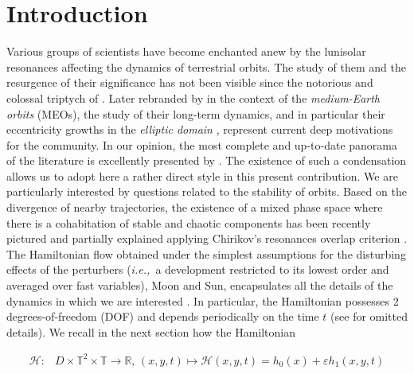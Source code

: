 \documentclass{amsart}
\theoremstyle{definition}
\theoremstyle{remark}
\numberwithin{equation}{section}
\newcommand{\ie}{\textit{i.e.,\ }}
\begin{document}
\maketitle 
\tableofcontents
\section{Introduction}
Various groups of scientists have become enchanted anew by the lunisolar resonances affecting the dynamics of terrestrial orbits. The study of them and the resurgence of their significance has not been visible since the notorious and colossal triptych of \cite{sBr99,sBr01-2,sBr01}. Later rebranded by \cite{aRo08} in the context of the \textit{medium-Earth orbits} (MEOs), the study of their long-term dynamics, and in particular their eccentricity growths in the \textit{elliptic domain} \citep{bBo09}, represent current deep motivations for the community. In our opinion, the most complete and up-to-date panorama of the literature is excellently presented by \cite{rAr18}. The existence of such a condensation allows us to adopt here a rather direct {\color{black} style in} this present contribution. We are particularly interested by questions related to the stability of orbits. Based on the divergence of nearby trajectories, the existence of a mixed phase space where there is a cohabitation of stable and chaotic components has been recently pictured \citep{jDa16,aCe16,aCe16-siam,iGk16,aCe17} and partially  explained applying Chirikov's resonances overlap criterion \citep{bCh79}. The Hamiltonian flow obtained under the simplest 
assumptions for the disturbing effects of the perturbers (\ie a development restricted to its lowest order and averaged over fast variables), Moon and Sun, encapsulates all the details of the dynamics {\color{black} in which} we are interested \citep{jDa16}. In particular, the Hamiltonian {\color{black} possesses} $2$ {\color{black} degrees}-of-freedom (DOF) and depends periodically  on the time $t$ (see \cite{aCe17} for omitted details). 
We recall in the next section how the Hamiltonian 

\begin{equation}\label{Eq:Hamiltonian}
\begin{aligned}
   	\mathcal{H} \colon &D \times \mathbb{T}^{2} \times \mathbb{T} \to \mathbb{R}, \, (x,y,t) \mapsto \mathcal{H}(x,y,t)=h_{0}(x) + \varepsilon h_{1}(x,y,t)
 \end{aligned}
\end{equation}  
\end{document}

